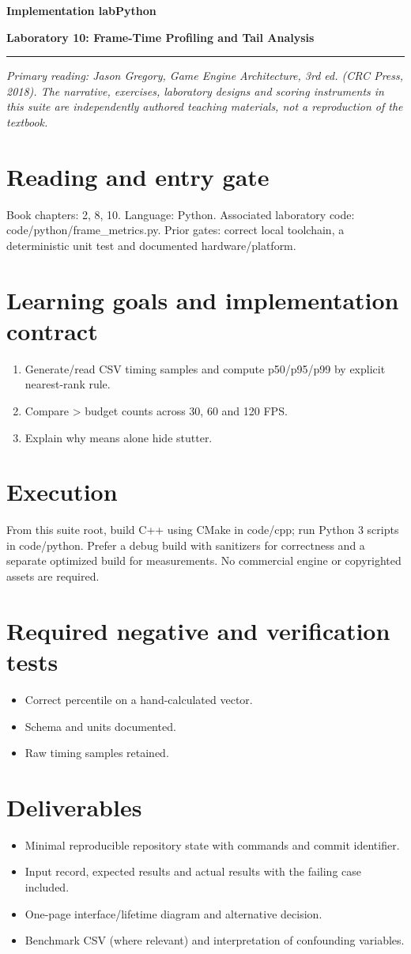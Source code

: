 \documentclass[11pt,letterpaper]{article}
\newcommand{\DocType}{Reference}
\newcommand{\SuiteHeading}[3]{%
\renewcommand{\DocType}{#2}%
{\small\bfseries\sffamily\color{EngineTeal}#2\hfill #3}\par\vspace{6pt}
{\LARGE\bfseries\color{EngineBlue}#1}\par\vspace{4pt}
{\color{EngineTeal}\rule{\linewidth}{1pt}}\par\vspace{7pt}}
\newcommand{\SourceNote}{\footnotesize\textit{Primary reading: Jason Gregory, \emph{Game Engine Architecture}, 3rd ed. (CRC Press, 2018). The narrative, exercises, laboratory designs and scoring instruments in this suite are independently authored teaching materials, not a reproduction of the textbook.}\normalsize\par}
\begin{document}
\SuiteHeading{Laboratory 10: Frame-Time Profiling and Tail Analysis}{Implementation lab}{Python}
\SourceNote
\section{Reading and entry gate}
Book chapters: 2, 8, 10. Language: Python. Associated laboratory code: code/python/frame\_metrics.py. Prior gates: correct local toolchain, a deterministic unit test and documented hardware/platform.

\section{Learning goals and implementation contract}
\begin{enumerate}
\item Generate/read CSV timing samples and compute p50/p95/p99 by explicit nearest-rank rule.
\item Compare > budget counts across 30, 60 and 120 FPS.
\item Explain why means alone hide stutter.
\end{enumerate}
\section{Execution}
From this suite root, build C++ using CMake in code/cpp; run Python 3 scripts in code/python. Prefer a debug build with sanitizers for correctness and a separate optimized build for measurements. No commercial engine or copyrighted assets are required.

\section{Required negative and verification tests}
\begin{itemize}
\item Correct percentile on a hand-calculated vector.
\item Schema and units documented.
\item Raw timing samples retained.
\end{itemize}
\section{Deliverables}
\begin{itemize}
\item Minimal reproducible repository state with commands and commit identifier.
\item Input record, expected results and actual results with the failing case included.
\item One-page interface/lifetime diagram and alternative decision.
\item Benchmark CSV (where relevant) and interpretation of confounding variables.
\end{itemize}
\end{document}
